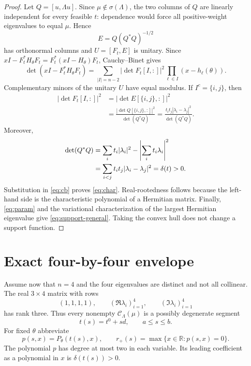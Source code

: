 \documentclass[11pt]{article}
\newcommand{\R}{\mathbb R}
\newcommand{\spec}{\sigma}
\newcommand{\cC}{\mathcal C}
\numberwithin{equation}{section}
\theoremstyle{definition}
\begin{document}
\begin{proof}
Let $Q=[u,\Lambda u]$.  Since $\mu\notin\spec(\Lambda)$, the two columns of
$Q$ are linearly independent for every feasible $t$: dependence would force
all positive-weight eigenvalues to equal $\mu$.  Hence
\[
 E=Q(Q^*Q)^{-1/2}
\]
has orthonormal columns and $U=[F_t,E]$ is unitary.  Since
$xI-F_t^*H_\theta F_t=F_t^*(xI-H_\theta)F_t$, Cauchy--Binet gives
\begin{equation}
 \det(xI-F_t^*H_\theta F_t)
 =\sum_{|I|=n-2}|\det F_t[I,:]|^2
   \prod_{\ell\in I}(x-h_\ell(\theta)).
 \label{eq:cb}
\end{equation}
Complementary minors of the unitary $U$ have equal modulus.  If
$I^c=\{i,j\}$, then
\begin{align*}
 |\det F_t[I,:]|^2
 &=|\det E[\{i,j\},:]|^2\\
 &=\frac{|\det Q[\{i,j\},:]|^2}{\det(Q^*Q)}
 =\frac{t_it_j|\lambda_i-\lambda_j|^2}{\det(Q^*Q)}.
\end{align*}
Moreover,
\begin{align}
 \det(Q^*Q)
 &=\sum_i t_i|\lambda_i|^2-\left|\sum_i t_i\lambda_i\right|^2\notag\\
 &=\sum_{i<j}t_it_j|\lambda_i-\lambda_j|^2
 =\delta(t)>0.\label{eq:gram}
\end{align}
Substitution in \eqref{eq:cb} proves \eqref{eq:char}.  Real-rootedness follows because the
left-hand side is the characteristic polynomial of a Hermitian matrix.
Finally, \eqref{eq:param} and the variational characterization of the largest Hermitian
eigenvalue give \eqref{eq:support-general}.  Taking the convex hull does not change a support
function.
\end{proof}

\section{Exact four-by-four envelope}

Assume now that $n=4$ and the four eigenvalues are distinct and not all
collinear.  The real $3\times4$ matrix with rows
\[
 (1,1,1,1),\qquad (\Re\lambda_i)_{i=1}^4,
 \qquad(\Im\lambda_i)_{i=1}^4
\]
has rank three.  Thus every nonempty $\cC_\Lambda(\mu)$ is a possibly
degenerate segment
\[
 t(s)=t^0+s d,\qquad a\leq s\leq b.
\]
For fixed $\theta$ abbreviate
\[
 p(s,x)=P_\theta(t(s),x),
 \qquad r_+(s)=\max\{x\in\R:p(s,x)=0\}.
\]
The polynomial $p$ has degree at most two in each variable.  Its leading
coefficient as a polynomial in $x$ is $\delta(t(s))>0$.
\end{document}
